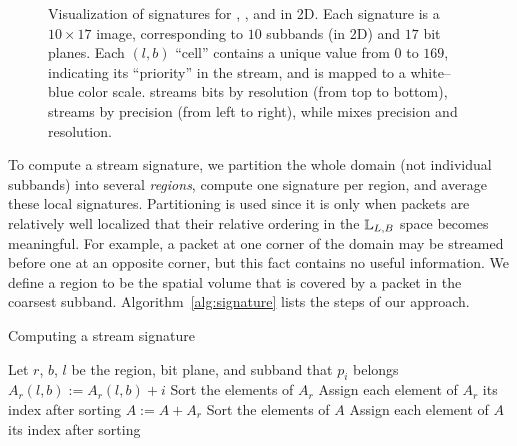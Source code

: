 \begin{figure}[!t]
\centering
\vspace{-0.5em}
\caption{Visualization of signatures for \slvl, \sbit, and \swav in 2D. Each signature is a
$10\times 17$ image, corresponding to $10$ subbands (in 2D) and $17$ bit planes. Each $(l,b)$
``cell'' contains a unique value from $0$ to $169$, indicating its ``priority'' in the stream, and
is mapped to a white--blue color scale. \slvl streams bits by resolution (from top to bottom), \sbit
streams by precision (from left to right), while \swav mixes precision and resolution.}
\label{fig:example-signatures}
\vspace{-1.5em}
\end{figure}

To compute a stream signature, we partition the whole domain (not individual subbands) into several
\emph{regions}, compute one signature per region, and average these local signatures. Partitioning
is used since it is only when packets are relatively well localized that their relative ordering in
the ${\mathbb L}_{L,B}$ space becomes meaningful. For example, a packet at one corner of the domain may
be streamed before one at an opposite corner, but this fact contains no useful information. We
define a region to be the spatial volume that is covered by a packet in the coarsest subband.
Algorithm~\ref{alg:signature} lists the steps of our approach.

\begin{algorithm}[h]
  \caption{Computing a stream signature}
  \begin{algorithmic}[1]
			\State Let $r$, $b$, $l$ be the region, bit plane, and subband that $p_i$ belongs
			\State $A_r(l,b) := A_r(l,b)+i$
		\EndFor
			\State Sort the elements of $A_r$
			\State Assign each element of $A_r$ its index after sorting
			\State $A := A+A_r$
		\EndFor
		\State Sort the elements of $A$
		\State Assign each element of $A$ its index after sorting
	\end{algorithmic}
	\label{alg:signature}
\end{algorithm}

